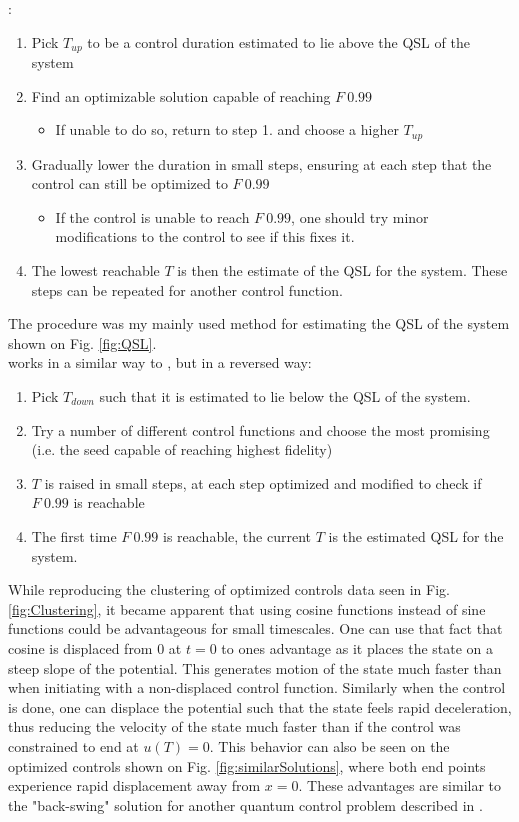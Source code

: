 \documentclass[a4paper, twocolumn]{revtex4-1}
\begin{document}
:
\begin{enumerate}
	\item Pick $T_{up}$ to be a control duration estimated to lie above the QSL of the system
	\item Find an optimizable solution capable of reaching $F~0.99$
	\begin{itemize}
		\item If unable to do so, return to step 1. and choose a higher $T_{up}$
	\end{itemize}
	\item Gradually lower the duration in small steps, ensuring at each step that the control can still be optimized to $F~0.99$
	\begin{itemize}
		\item If the control is unable to reach $F~0.99$, one should try minor modifications to the control to see if this fixes it.
	\end{itemize}
	\item The lowest reachable $T$ is then the estimate of the QSL for the system. These steps can be repeated for another control function.
\end{enumerate}
The  procedure was my mainly used method for estimating the QSL of the system shown on Fig. \ref{fig:QSL}.\\

 works in a similar way to , but in a reversed way:
\begin{enumerate}
	\item Pick $T_{down}$ such that it is estimated to lie below the QSL of the system.
	\item Try a number of different control functions and choose the most promising (i.e. the seed capable of reaching highest fidelity)
	\item $T$ is raised in small steps, at each step optimized and modified to check if $F~0.99$ is reachable
	\item The first time $F~0.99$ is reachable, the current $T$ is the estimated QSL for the system.
\end{enumerate}

While reproducing the clustering of optimized controls data seen in Fig. \ref{fig:Clustering}, it became apparent that using cosine functions instead of sine functions could be advantageous for small timescales. One can use that fact that cosine is displaced from 0 at $t=0$ to ones advantage as it places the state on a steep slope of the potential. This generates motion of the state much faster than when initiating with a non-displaced control function. Similarly when the control is done, one can displace the potential such that the state feels rapid deceleration, thus reducing the velocity of the state much faster than if the control was constrained to end at $u(T)=0$. This behavior can also be seen on the optimized controls shown on Fig. \ref{fig:similarSolutions}, where both end points experience rapid displacement away from $x=0$. These advantages are similar to the "back-swing" solution for another quantum control problem described in \cite{QM2Paper}.
\end{document}
